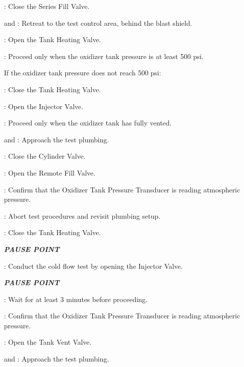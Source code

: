 \begin{checklist}
\begin{checklist}[label=$\bullet$]
\begin{checklist}
            \item \primary{}: Close the Series Fill Valve.
            \item \primary{} and \secondary: Retreat to the test control area, behind the blast shield.
        \end{checklist}
    \end{checklist}
    \item \heat: Open the Tank Heating Valve.
    \item \daq{}: Proceed only when the oxidizer tank pressure is at least 500 psi.
    \begin{checklist}[label=$\bullet$]
        \item If the oxidizer tank pressure does not reach 500 psi:
        \begin{checklist}
            \item \heat: Close the Tank Heating Valve.
            \item \primary{}: Open the Injector Valve.
            \item \secondary: Proceed only when the oxidizer tank has fully vented.
            \item \primary{} and \secondary: Approach the test plumbing.
            \item \primary{}: Close the Cylinder Valve.
            \item \primary{}: Open the Remote Fill Valve.
            \item \daq{}: Confirm that the Oxidizer Tank Pressure Transducer is reading atmospheric pressure.
            \item \ops{}: Abort test procedures and revisit plumbing setup.
        \end{checklist}
    \end{checklist}
    \item \heat: Close the Tank Heating Valve.
    \item \textbf{\textit{PAUSE POINT}}
    \item \primary{}: Conduct the cold flow test by opening the Injector Valve.
    \item \textbf{\textit{PAUSE POINT}}
    \item \ops{}: Wait for at least 3 minutes before proceeding.
    \item \daq{}: Confirm that the Oxidizer Tank Pressure Transducer is reading atmospheric pressure.
    \item \primary{}: Open the Tank Vent Valve.
    \item \primary{} and \secondary: Approach the test plumbing.

\end{checklist}
